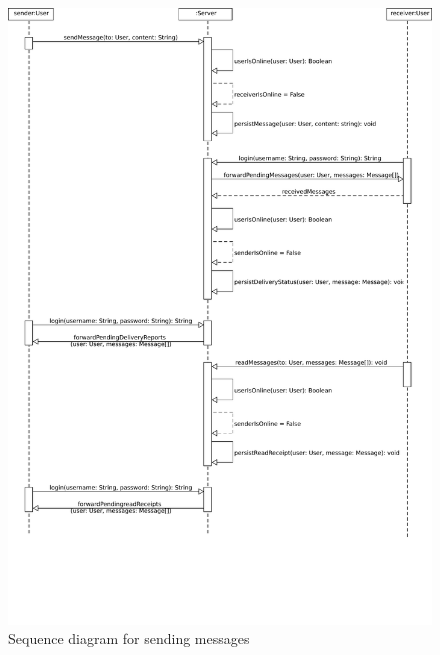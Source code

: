 \begin{figure}[H]
    \centering
    \includegraphics[width=1.0\textwidth]{./graphics/sequenceDiagramMessage}
    \caption{Sequence diagram for sending messages}
    \label{fig:sequenceDiagramMessage}
\end{figure}

